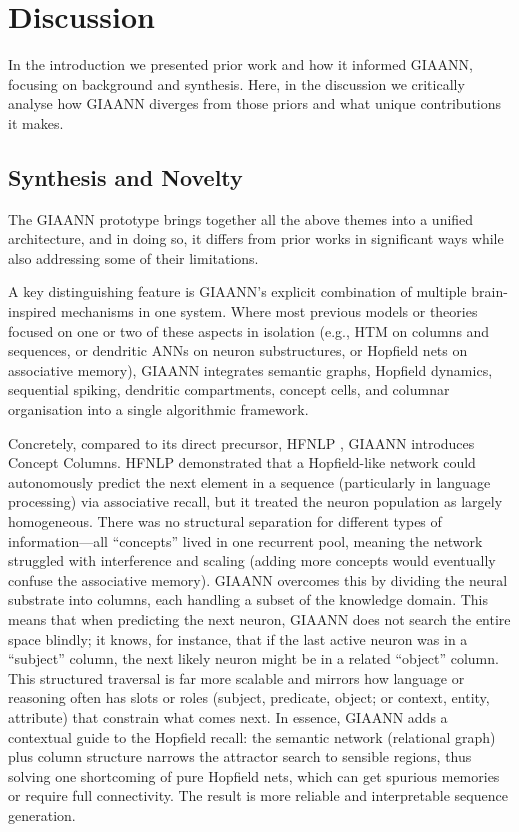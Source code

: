 \section{Discussion}

In the introduction we presented prior work and how it informed GIAANN, focusing on background and synthesis.
Here, in the discussion we critically analyse how GIAANN diverges from those priors and what unique contributions it makes.

\subsection{Synthesis and Novelty}

The GIAANN prototype brings together all the above themes into a unified architecture, and in doing so, it differs from prior works in significant ways while also addressing some of their limitations.

A key distinguishing feature is GIAANN’s explicit combination of multiple brain-inspired mechanisms in one system.
Where most previous models or theories focused on one or two of these aspects in isolation (e.g., HTM on columns and sequences, or dendritic ANNs on neuron substructures, or Hopfield nets on associative memory), GIAANN integrates semantic graphs, Hopfield dynamics, sequential spiking, dendritic compartments, concept cells, and columnar organisation into a single algorithmic framework.

Concretely, compared to its direct precursor, HFNLP \citep{bairesearch2024HFNLPpy}, GIAANN introduces Concept Columns.
HFNLP demonstrated that a Hopfield-like network could autonomously predict the next element in a sequence (particularly in language processing) via associative recall, but it treated the neuron population as largely homogeneous.
There was no structural separation for different types of information---all ``concepts'' lived in one recurrent pool, meaning the network struggled with interference and scaling (adding more concepts would eventually confuse the associative memory).
GIAANN overcomes this by dividing the neural substrate into columns, each handling a subset of the knowledge domain.
This means that when predicting the next neuron, GIAANN does not search the entire space blindly; it knows, for instance, that if the last active neuron was in a ``subject'' column, the next likely neuron might be in a related ``object'' column.
This structured traversal is far more scalable and mirrors how language or reasoning often has slots or roles (subject, predicate, object; or context, entity, attribute) that constrain what comes next.
In essence, GIAANN adds a contextual guide to the Hopfield recall: the semantic network (relational graph) plus column structure narrows the attractor search to sensible regions, thus solving one shortcoming of pure Hopfield nets, which can get spurious memories or require full connectivity.
The result is more reliable and interpretable sequence generation.

